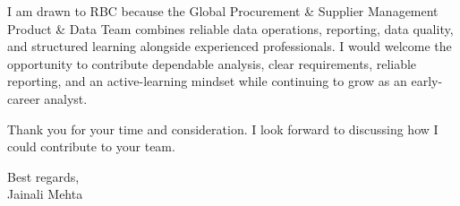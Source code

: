 \documentclass[letterpaper,11pt]{article}
\begin{document}
\bigbreak
I am drawn to RBC because the Global Procurement \& Supplier Management Product \& Data Team combines reliable data operations, reporting, data quality, and structured learning alongside experienced professionals. I would welcome the opportunity to contribute dependable analysis, clear requirements, reliable reporting, and an active-learning mindset while continuing to grow as an early-career analyst.

\bigbreak
Thank you for your time and consideration. I look forward to discussing how I could contribute to your team.

\bigbreak
Best regards,\\
Jainali Mehta
\end{document}
